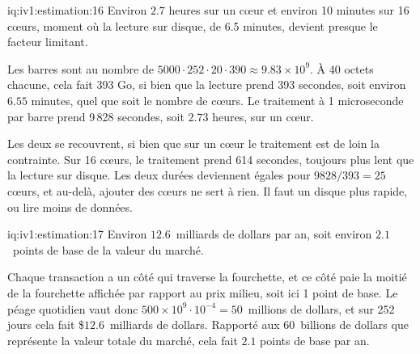 \begin{solution}{iq:iv1:estimation:16}
Environ $2.7$ heures sur un cœur et environ 10 minutes sur 16 cœurs, moment où la lecture sur disque, de 6.5 minutes, devient presque le facteur limitant.

Les barres sont au nombre de $5000 \cdot 252 \cdot 20 \cdot 390 \approx 9.83 \times 10^9$. À 40 octets chacune, cela fait 393 Go, si bien que la lecture prend 393 secondes, soit environ $6.55$ minutes, quel que soit le nombre de cœurs. Le traitement à 1 microseconde par barre prend 9\,828 secondes, soit $2.73$ heures, sur un cœur.

Les deux se recouvrent, si bien que sur un cœur le traitement est de loin la contrainte. Sur 16 cœurs, le traitement prend 614 secondes, toujours plus lent que la lecture sur disque. Les deux durées deviennent égales pour $9828/393 = 25$ cœurs, et au-delà, ajouter des cœurs ne sert à rien. Il faut un disque plus rapide, ou lire moins de données.

\end{solution}

\begin{solution}{iq:iv1:estimation:17}
Environ $12.6$~milliards de dollars par an, soit environ $2.1$~points de base de la valeur du marché.

Chaque transaction a un côté qui traverse la fourchette, et ce côté paie la moitié de la fourchette affichée par rapport au prix milieu, soit ici 1 point de base. Le péage quotidien vaut donc $500 \times 10^9 \cdot 10^{-4} = 50$~millions de dollars, et sur 252 jours cela fait \$$12.6$~milliards de dollars. Rapporté aux 60~billions de dollars que représente la valeur totale du marché, cela fait $2.1$ points de base par an.

\end{solution}

